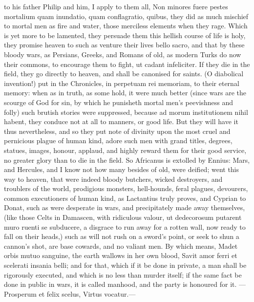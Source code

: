 {to his father Philip and him, I apply to them all, Non minores fuere
pestes mortalium quam inundatio, quam conflagratio, quibus, \etc{} they
did as much mischief to mortal men as fire and water, those merciless
elements when they rage. Which is yet more to be lamented, they
persuade them this hellish course of life is holy, they promise heaven
to such as venture their lives bello sacro, and that by these bloody
wars, as Persians, Greeks, and Romans of old, as modern Turks do now
their commons, to encourage them to fight, ut cadant infeliciter. If
they die in the field, they go directly to heaven, and shall be
canonised for saints. (O diabolical invention!) put in the Chronicles,
in perpetuam rei memoriam, to their eternal memory: when as in truth,
as some hold, it were much better (since wars are the scourge of
God for sin, by which he punisheth mortal men's peevishness and folly)
such brutish stories were suppressed, because ad morum institutionem
nihil habent, they conduce not at all to manners, or good life. But
they will have it thus nevertheless, and so they put note of
divinity upon the most cruel and pernicious plague of human kind,
adore such men with grand titles, degrees, statues, images,
honour, applaud, and highly reward them for their good service, no
greater glory than to die in the field. So Africanus is extolled by
Ennius: Mars, and Hercules, and I know not how many besides of
old, were deified; went this way to heaven, that were indeed bloody
butchers, wicked destroyers, and troublers of the world, prodigious
monsters, hell-hounds, feral plagues, devourers, common executioners of
human kind, as Lactantius truly proves, and Cyprian to Donat, such as
were desperate in wars, and precipitately made away themselves, (like
those Celts in Damascen, with ridiculous valour, ut dedecorosum
putarent muro ruenti se subducere, a disgrace to run away for a rotten
wall, now ready to fall on their heads,) such as will not rush on a
sword's point, or seek to shun a cannon's shot, are base cowards, and
no valiant men. By which means, Madet orbis mutuo sanguine, the earth
wallows in her own blood,
Savit amor ferri et scelerati insania belli; and for that, which
if it be done in private, a man shall be rigorously executed, and
which is no less than murder itself; if the same fact be done in public
in wars, it is called manhood, and the party is honoured for it.
---Prosperum et felix scelus,
Virtus vocatur.---

}
